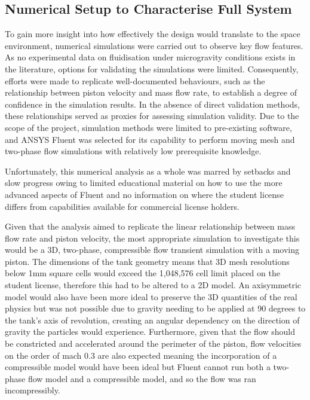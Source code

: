 \subsection{Numerical Setup to Characterise Full System}
To gain more insight into how effectively the design would translate to the space environment, numerical simulations were carried out to observe key flow features. As no experimental data on fluidisation under microgravity conditions exists in the literature, options for validating the simulations were limited. Consequently, efforts were made to replicate well-documented behaviours, such as the relationship between piston velocity and mass flow rate, to establish a degree of confidence in the simulation results. In the absence of direct validation methods, these relationships served as proxies for assessing simulation validity. Due to the scope of the project, simulation methods were limited to pre-existing software, and ANSYS Fluent was selected for its capability to perform moving mesh and two-phase flow simulations with relatively low prerequisite knowledge.

Unfortunately, this numerical analysis as a whole was marred by setbacks and slow progress owing to limited educational material on how to use the more advanced aspects of Fluent and no information on where the student license differs from capabilities available for commercial license holders.

Given that the analysis aimed to replicate the linear relationship between mass flow rate and piston velocity, the most appropriate simulation to investigate this would be a 3D, two-phase, compressible flow transient simulation with a moving piston. The dimensions of the tank geometry means that 3D mesh resolutions below 1mm square cells would exceed the 1,048,576 cell limit placed on the student license, therefore this had to be altered to a 2D model. An axisymmetric model would also have been more ideal to preserve the 3D quantities of the real physics but was not possible due to gravity needing to be applied at 90 degrees to the tank's axis of revolution, creating an angular dependency on the direction of gravity the particles would experience. Furthermore, given that the flow should be constricted and accelerated around the perimeter of the piston, flow velocities on the order of mach 0.3 are also expected meaning the incorporation of a compressible model would have been ideal but Fluent cannot run both a two-phase flow model and a compressible model, and so the flow was ran incompressibly.

